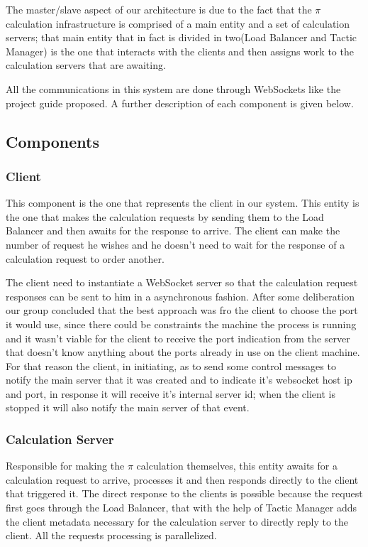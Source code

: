 \documentclass[12pt]{article}
\begin{document}
The master/slave aspect of our architecture is due to the fact that the $\pi$ calculation infrastructure is comprised of a main entity and a set of calculation servers; that main entity that in fact is divided in two(Load Balancer and Tactic Manager) is the one that interacts with the clients and then assigns work to the calculation servers that are awaiting.

All the communications in this system are done through WebSockets like the project guide proposed. A further description of each component is given below.


\subsection{Components} \label{components} %

\subsubsection{Client}
This component is the one that represents the client in our system. This entity is the one that makes the calculation requests by sending them to the Load Balancer and then awaits for the response to arrive. The client can make the number of request he wishes and he doesn't need to wait for the response of a calculation request to order another.

The client need to instantiate a WebSocket server so that the calculation request responses can be sent to him in a asynchronous fashion. After some deliberation our group concluded that the best approach was fro the client to choose the port it would use, since there could be constraints the machine the process is running and it wasn't viable for the client to receive the port indication from the server that doesn't know anything about the ports already in use on the client machine. For that reason the client, in initiating, as to send some control messages to notify the main server that it was created and to indicate it's websocket host ip and port, in response it will receive it's internal server id; when the client is stopped it will also notify the main server of that event.

\subsubsection{Calculation Server}
Responsible for making the $\pi$ calculation themselves, this entity awaits for a calculation request to arrive, processes it and then responds directly to the client that triggered it. The direct response to the clients is possible because the request first goes through the Load Balancer, that with the help of Tactic Manager adds the client metadata necessary for the calculation server to directly reply to the client. All the requests processing is parallelized.
\end{document}
